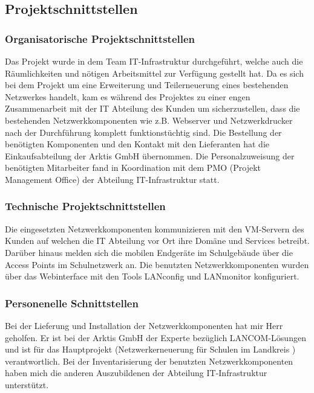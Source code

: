 \subsection{Projektschnittstellen} 
\label{sec:Projektschnittstellen}
\subsubsection{Organisatorische Projektschnittstellen}
Das Projekt wurde in dem Team IT-Infrastruktur durchgeführt, welche auch die Räumlichkeiten und nötigen Arbeitsmittel zur Verfügung gestellt hat. Da es sich bei dem Projekt um eine Erweiterung und Teilerneuerung eines bestehenden Netzwerkes handelt, kam es während des Projektes zu einer engen Zusammenarbeit mit der IT Abteilung des Kunden um sicherzustellen, dass die bestehenden Netzwerkkomponenten wie z.B. Webserver und Netzwerkdrucker nach der Durchführung komplett funktionstüchtig sind. Die Bestellung der benötigten Komponenten und den Kontakt mit den Lieferanten hat die Einkaufsabteilung der Arktis GmbH übernommen. Die Personalzuweisung der benötigten Mitarbeiter fand in Koordination mit dem PMO (Projekt Management Office) der Abteilung IT-Infrastruktur statt.    
\subsubsection{Technische Projektschnittstellen}
Die eingesetzten Netzwerkkomponenten kommunizieren mit den VM-Servern des Kunden auf welchen die IT Abteilung vor Ort ihre Domäne und Services betreibt. Darüber hinaus melden sich die mobilen Endgeräte im Schulgebäude über die Access Points im Schulnetzwerk an. Die benutzten Netzwerkkomponenten wurden über das Webinterface mit den Tools LANconfig und LANmonitor konfiguriert.
\subsubsection{Personenelle Schnittstellen}
Bei der Lieferung und Installation der Netzwerkkomponenten hat mir Herr  geholfen. Er ist bei der Arktis GmbH der Experte bezüglich LANCOM-Lösungen und ist für das Hauptprojekt (Netzwerkerneuerung für Schulen im Landkreis ) verantwortlich. Bei der Inventarisierung der benutzten Netzwerkkomponenten haben mich die anderen Auszubildenen der Abteilung IT-Infrastruktur unterstützt. 
\begin{comment}
	\item Mit welchen anderen Systemen interagiert die Anwendung (technische Schnittstellen)?
	\item Wer genehmigt das Projekt \bzw stellt Mittel zur Verfügung? 
	\item Wer sind die Benutzer der Anwendung?
	\item Wem muss das Ergebnis präsentiert werden?
\end{comment}


